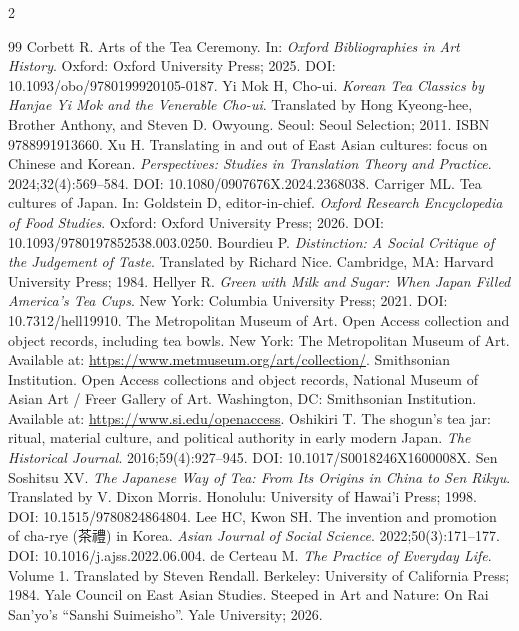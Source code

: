 \documentclass[numbers]{IntechOpen-Book}
\newcommand{\zh}[1]{{\CJKfontspec{Noto Serif CJK SC}\upshape #1}}
\begin{document}
\begin{backmatter}
\begin{multicols}{2}
\begin{thebibliography}{99}
 Corbett R. Arts of the Tea Ceremony. In: \textit{Oxford Bibliographies in Art History}. Oxford: Oxford University Press; 2025. DOI: 10.1093/obo/9780199920105-0187.
 Yi Mok H, Cho-ui. \textit{Korean Tea Classics by Hanjae Yi Mok and the Venerable Cho-ui}. Translated by Hong Kyeong-hee, Brother Anthony, and Steven D. Owyoung. Seoul: Seoul Selection; 2011. ISBN 9788991913660.
 Xu H. Translating in and out of East Asian cultures: focus on Chinese and Korean. \textit{Perspectives: Studies in Translation Theory and Practice}. 2024;32(4):569--584. DOI: 10.1080/0907676X.2024.2368038.
 Carriger ML. Tea cultures of Japan. In: Goldstein D, editor-in-chief. \textit{Oxford Research Encyclopedia of Food Studies}. Oxford: Oxford University Press; 2026. DOI: 10.1093/9780197852538.003.0250.
 Bourdieu P. \textit{Distinction: A Social Critique of the Judgement of Taste}. Translated by Richard Nice. Cambridge, MA: Harvard University Press; 1984.
 Hellyer R. \textit{Green with Milk and Sugar: When Japan Filled America's Tea Cups}. New York: Columbia University Press; 2021. DOI: 10.7312/hell19910.
 The Metropolitan Museum of Art. Open Access collection and object records, including tea bowls. New York: The Metropolitan Museum of Art. Available at: \url{https://www.metmuseum.org/art/collection/}.
 Smithsonian Institution. Open Access collections and object records, National Museum of Asian Art / Freer Gallery of Art. Washington, DC: Smithsonian Institution. Available at: \url{https://www.si.edu/openaccess}.
 Oshikiri T. The shogun's tea jar: ritual, material culture, and political authority in early modern Japan. \textit{The Historical Journal}. 2016;59(4):927--945. DOI: 10.1017/S0018246X1600008X.
 Sen Soshitsu XV. \textit{The Japanese Way of Tea: From Its Origins in China to Sen Rikyu}. Translated by V. Dixon Morris. Honolulu: University of Hawai'i Press; 1998. DOI: 10.1515/9780824864804.
 Lee HC, Kwon SH. The invention and promotion of cha-rye (\zh{茶禮}) in Korea. \textit{Asian Journal of Social Science}. 2022;50(3):171--177. DOI: 10.1016/j.ajss.2022.06.004.
 de Certeau M. \textit{The Practice of Everyday Life}. Volume 1. Translated by Steven Rendall. Berkeley: University of California Press; 1984.
 Yale Council on East Asian Studies. Steeped in Art and Nature: On Rai San'yo's ``Sanshi Suimeisho''. Yale University; 2026.
\end{thebibliography}
\end{multicols}
\end{backmatter}
\end{document}

